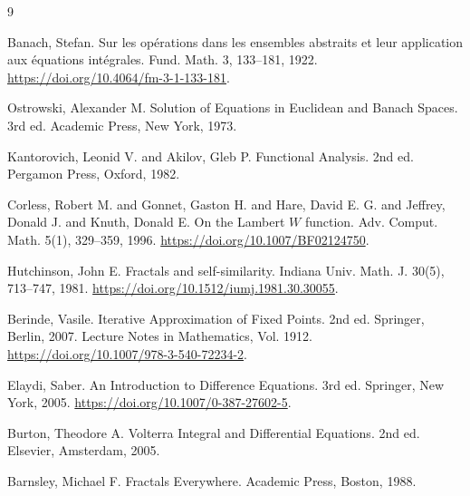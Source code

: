 \documentclass[11pt,a4paper]{amsart}
\begin{document}
\begin{thebibliography}{9}

 Banach, Stefan. Sur les op{\'e}rations dans les ensembles abstraits et leur application aux {\'e}quations int{\'e}grales. Fund. Math. 3, 133--181, 1922. \url{https://doi.org/10.4064/fm-3-1-133-181}.

 Ostrowski, Alexander M. Solution of Equations in Euclidean and Banach Spaces. 3rd ed. Academic Press, New York, 1973.

 Kantorovich, Leonid V. and Akilov, Gleb P. Functional Analysis. 2nd ed. Pergamon Press, Oxford, 1982.

 Corless, Robert M. and Gonnet, Gaston H. and Hare, David E. G. and Jeffrey, Donald J. and Knuth, Donald E. On the Lambert $W$ function. Adv. Comput. Math. 5(1), 329--359, 1996. \url{https://doi.org/10.1007/BF02124750}.

 Hutchinson, John E. Fractals and self-similarity. Indiana Univ. Math. J. 30(5), 713--747, 1981. \url{https://doi.org/10.1512/iumj.1981.30.30055}.

 Berinde, Vasile. Iterative Approximation of Fixed Points. 2nd ed. Springer, Berlin, 2007. Lecture Notes in Mathematics, Vol. 1912. \url{https://doi.org/10.1007/978-3-540-72234-2}.

 Elaydi, Saber. An Introduction to Difference Equations. 3rd ed. Springer, New York, 2005. \url{https://doi.org/10.1007/0-387-27602-5}.

 Burton, Theodore A. Volterra Integral and Differential Equations. 2nd ed. Elsevier, Amsterdam, 2005.

 Barnsley, Michael F. Fractals Everywhere. Academic Press, Boston, 1988.

\end{thebibliography}
\end{document}
